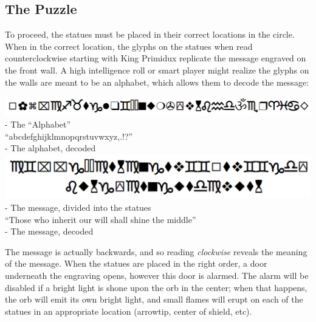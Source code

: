 \subsection{The Puzzle}
To proceed, the statues must be placed in their correct locations in the circle. When in the correct location, the glyphs on the statues when read counterclockwise starting with King Primidux replicate the message engraved on the front wall. A high intelligence roll or smart player might realize the glyphs on the walls are meant to be an alphabet, which allows them to decode the message:
\begin{center}
\includegraphics[scale=0.5]{combats/alphabet.PNG}\\
- The ``Alphabet''\\

``abcdefghijklmnopqrstuvwxyz,.!?''\\
- The alphabet, decoded\\

\includegraphics[scale=0.5]{combats/message.PNG}\\
- The message, divided into the statues \\

``Those who inherit our will shall shine the middle''\\
- The message, decoded
\end{center}

The message is actually backwards, and so reading \textit{clockwise} reveals the meaning of the message. When the statues are placed in the right order, a door underneath the engraving opens, however this door is alarmed. The alarm will be disabled if a bright light is shone upon the orb in the center; when that happens, the orb will emit its own bright light, and small flames will erupt on each of the statues in an appropriate location (arrowtip, center of shield, etc).

